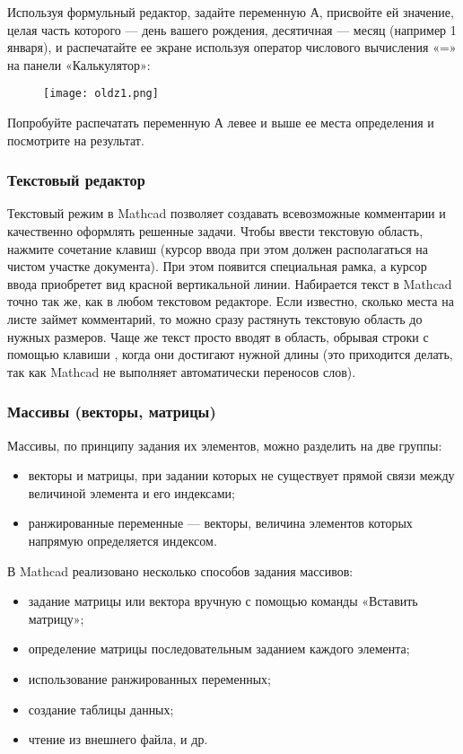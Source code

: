 Используя формульный редактор, задайте переменную $А$, присвойте ей значение, целая часть которого --- день вашего рождения, десятичная --- месяц (например 1 января), и распечатайте ее экране используя оператор числового вычисления «=» на панели «Калькулятор»:
\begin{figure}[h]
	\begin{center}
		\texttt{[image: oldz1.png]}
	\end{center}
\end{figure}

Попробуйте распечатать переменную $А$ левее и выше ее места определения и посмотрите на результат.

\subsubsection*{Текстовый редактор}
Текстовый режим в Mathcad позволяет создавать всевозможные комментарии и качественно оформлять решенные задачи.
Чтобы ввести текстовую область, нажмите сочетание клавиш  (курсор ввода при этом должен располагаться на чистом участке документа). При этом появится специальная рамка, а курсор ввода приобретет вид красной вертикальной линии.
Набирается текст в Mathcad точно так же, как в любом текстовом редакторе. Если известно, сколько места на листе займет комментарий, то можно сразу растянуть текстовую область до нужных размеров. Чаще же текст просто вводят в область, обрывая строки с помощью клавиши \keys{\enter}, когда они достигают нужной длины (это приходится делать, так как Mathcad не выполняет автоматически переносов слов).


\subsubsection{Массивы (векторы, матрицы)}
Массивы, по принципу задания их элементов, можно разделить на две группы:
\begin{itemize}
	\item векторы и матрицы, при задании которых не существует прямой связи между величиной элемента и его индексами;
	\item ранжированные переменные --- векторы, величина элементов которых напрямую определяется индексом.
\end{itemize}
В Mathcad реализовано несколько способов задания массивов:
\begin{itemize}
	\item задание матрицы или вектора вручную с помощью команды «Вставить матрицу»;
	\item определение матрицы последовательным заданием каждого элемента;
	\item  использование ранжированных переменных;
	\item создание таблицы данных;
	\item чтение из внешнего файла, и др.
\end{itemize}

